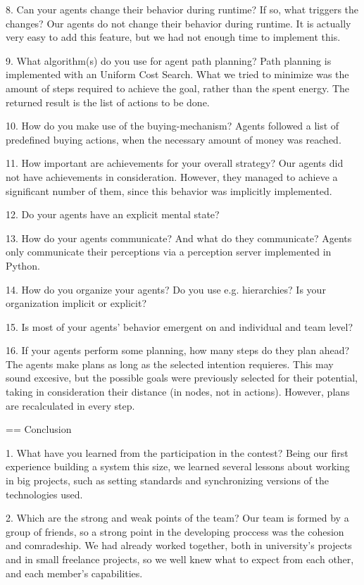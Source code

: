 \begin{question}
\begin{question}
8. Can your agents change their behavior during runtime? If so, what triggers
the changes?  Our agents do not change their behavior during runtime. It is
actually very easy to add this feature, but we had not enough time to
implement this.


9. What algorithm(s) do you use for agent path planning?  Path planning is
implemented with an Uniform Cost Search. What we tried to minimize was the
amount of steps required to achieve the goal, rather than the spent energy.
The returned result is the list of actions to be done.

10. How do you make use of the buying-mechanism?  Agents followed a list of
predefined buying actions, when the necessary amount of money was reached.

11. How important are achievements for your overall strategy?  Our agents did
not have achievements in consideration. However, they managed to achieve a
significant number of them, since this behavior was implicitly implemented.


12. Do your agents have an explicit mental state?

13. How do your agents communicate? And what do they communicate?  Agents only
communicate their perceptions via a perception server implemented in Python.

14. How do you organize your agents? Do you use e.g. hierarchies? Is your
organization implicit or explicit?

15. Is most of your agents’ behavior emergent on and individual and team
level?

16. If your agents perform some planning, how many steps do they plan ahead?
The agents make plans as long as the selected intention requieres. This may
sound excesive, but the possible goals were previously selected for their
potential, taking in consideration their distance (in nodes, not in actions).
However, plans are recalculated in every step.

== Conclusion

1. What have you learned from the participation in the contest?
    Being our first experience building a system this size, we learned several lessons about working in big projects, such as setting standards and synchronizing versions of the technologies used.


2. Which are the strong and weak points of the team?
    Our team is formed by a group of friends, so a strong point in the
    developing proccess was the cohesion and comradeship. We had
    already worked together, both in university's projects and in
    small freelance projects, so we well knew what to expect from each other,
    and each member's capabilities.


\end{question}
\end{question}
